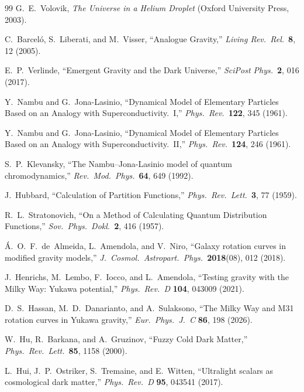 \documentclass[11pt,a4paper]{article}
\begin{document}
\begin{thebibliography}{99}
G.~E.~Volovik,
\textit{The Universe in a Helium Droplet}
(Oxford University Press, 2003).

C.~Barcel\'{o}, S.~Liberati, and M.~Visser,
``Analogue Gravity,''
\textit{Living Rev.\ Rel.}\ \textbf{8}, 12 (2005).

E.~P.~Verlinde,
``Emergent Gravity and the Dark Universe,''
\textit{SciPost Phys.}\ \textbf{2}, 016 (2017).

Y.~Nambu and G.~Jona-Lasinio,
``Dynamical Model of Elementary Particles Based on an Analogy
with Superconductivity.\ I,''
\textit{Phys.\ Rev.}\ \textbf{122}, 345 (1961).

Y.~Nambu and G.~Jona-Lasinio,
``Dynamical Model of Elementary Particles Based on an Analogy
with Superconductivity.\ II,''
\textit{Phys.\ Rev.}\ \textbf{124}, 246 (1961).

S.~P.~Klevansky,
``The Nambu--Jona-Lasinio model of quantum chromodynamics,''
\textit{Rev.\ Mod.\ Phys.}\ \textbf{64}, 649 (1992).

J.~Hubbard,
``Calculation of Partition Functions,''
\textit{Phys.\ Rev.\ Lett.}\ \textbf{3}, 77 (1959).

R.~L.~Stratonovich,
``On a Method of Calculating Quantum Distribution Functions,''
\textit{Sov.\ Phys.\ Dokl.}\ \textbf{2}, 416 (1957).

\'{A}.~O.~F.~de~Almeida, L.~Amendola, and V.~Niro,
``Galaxy rotation curves in modified gravity models,''
\textit{J.\ Cosmol.\ Astropart.\ Phys.}\ \textbf{2018}(08), 012 (2018).

J.~Henrichs, M.~Lembo, F.~Iocco, and L.~Amendola,
``Testing gravity with the Milky Way: Yukawa potential,''
\textit{Phys.\ Rev.\ D} \textbf{104}, 043009 (2021).

D.~S.~Hassan, M.~D.~Danarianto, and A.~Sulaksono,
``The Milky Way and M31 rotation curves in Yukawa gravity,''
\textit{Eur.\ Phys.\ J.\ C} \textbf{86}, 198 (2026).

W.~Hu, R.~Barkana, and A.~Gruzinov,
``Fuzzy Cold Dark Matter,''
\textit{Phys.\ Rev.\ Lett.}\ \textbf{85}, 1158 (2000).

L.~Hui, J.~P.~Ostriker, S.~Tremaine, and E.~Witten,
``Ultralight scalars as cosmological dark matter,''
\textit{Phys.\ Rev.\ D} \textbf{95}, 043541 (2017).


\end{thebibliography}
\end{document}
